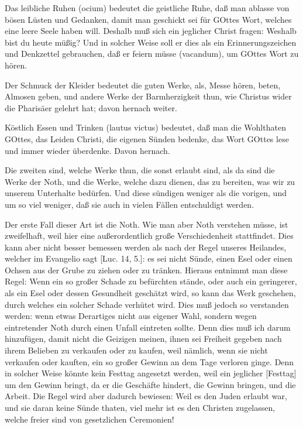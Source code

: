 Das leibliche Ruhen (ocium) bedeutet die geistliche Ruhe, daß man ablasse von bösen Lüsten und Gedanken, damit man geschickt sei für GOttes Wort, welches eine leere Seele haben will. Deshalb muß sich ein jeglicher Christ fragen: Weshalb bist du heute müßig? Und in solcher Weise soll er dies als ein Erinnerungszeichen und Denkzettel gebrauchen, daß er feiern müsse (vacandum), um GOttes Wort zu hören.

Der Schmuck der Kleider bedeutet die guten Werke, als, Messe hören, beten, Almosen geben, und andere Werke der Barmherzigkeit thun, wie Christus wider die Pharisäer gelehrt hat; davon hernach weiter.

Köstlich Essen und Trinken (lautus victus) bedeutet, daß man die Wohlthaten GOttes, das Leiden Christi, die eigenen Sünden bedenke, das Wort GOttes lese und immer wieder überdenke. Davon hernach.

Die zweiten sind, welche Werke thun, die sonst erlaubt sind, als da sind die Werke der Noth, und die Werke, welche dazu dienen, das zu bereiten, was wir zu unserem Unterhalte bedürfen. Und diese sündigen weniger als die vorigen, und um so viel weniger, daß sie auch in vielen Fällen entschuldigt werden.

Der erste Fall dieser Art ist die Noth. Wie man aber Noth verstehen müsse, ist zweifelhaft, weil hier eine außerordentlich große Verschiedenheit stattfindet. Dies kann aber nicht besser bemessen werden als nach der Regel unseres Heilandes, welcher im Evangelio sagt [Luc. 14, 5.]: es sei nicht Sünde, einen Esel oder einen Ochsen aus der Grube zu ziehen oder zu tränken. Hieraus entnimmt man diese Regel: Wenn ein so großer Schade zu befürchten stände, oder auch ein geringerer, als ein Esel oder dessen Gesundheit geschätzt wird, so kann das Werk geschehen, durch welches ein solcher Schade verhütet wird. Dies muß jedoch so verstanden werden: wenn etwas Derartiges nicht aus eigener Wahl, sondern wegen eintretender Noth durch einen Unfall eintreten sollte. Denn dies muß ich darum hinzufügen, damit nicht die Geizigen meinen, ihnen sei Freiheit gegeben nach ihrem Belieben zu verkaufen oder zu kaufen, weil nämlich, wenn sie nicht verkaufen oder kauften, ein so großer Gewinn an dem Tage verloren ginge. Denn in solcher Weise könnte kein Festtag angesetzt werden, weil ein jeglicher [Festtag] um den Gewinn bringt, da er die Geschäfte hindert, die Gewinn bringen, und die Arbeit. Die Regel wird aber dadurch bewiesen: Weil es den Juden erlaubt war, und sie daran keine Sünde thaten, viel mehr ist es den Christen zugelassen, welche freier sind von gesetzlichen Ceremonien!

